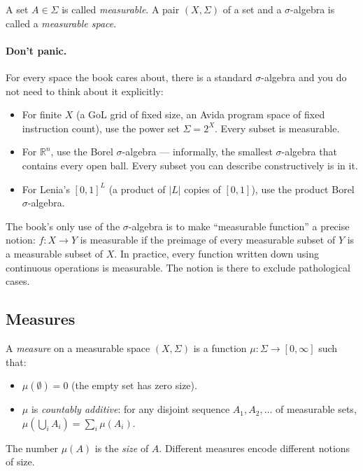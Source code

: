 A set $A \in \Sigma$ is called \emph{measurable}. A pair $(X,
\Sigma)$ of a set and a $\sigma$-algebra is called a \emph{measurable
space}.

\paragraph{Don't panic.} For every space the book cares about, there
is a standard $\sigma$-algebra and you do not need to think about it
explicitly:

\begin{itemize}[leftmargin=1.5em,itemsep=2pt]
  \item For finite $X$ (a GoL grid of fixed size, an Avida program
    space of fixed instruction count), use the power set $\Sigma =
    2^X$. Every subset is measurable.
  \item For $\mathbb{R}^n$, use the Borel $\sigma$-algebra ---
    informally, the smallest $\sigma$-algebra that contains every
    open ball. Every subset you can describe constructively is in
    it.
  \item For Lenia's $[0,1]^L$ (a product of $|L|$ copies of $[0,1]$),
    use the product Borel $\sigma$-algebra.
\end{itemize}

The book's only use of the $\sigma$-algebra is to make ``measurable
function'' a precise notion: $f : X \to Y$ is measurable if the
preimage of every measurable subset of $Y$ is a measurable subset of
$X$. In practice, every function written down using continuous
operations is measurable. The notion is there to exclude
pathological cases.

\subsection*{Measures}

A \emph{measure} on a measurable space $(X, \Sigma)$ is a function
$\mu : \Sigma \to [0, \infty]$ such that:

\begin{itemize}[leftmargin=1.5em,itemsep=2pt]
  \item $\mu(\emptyset) = 0$ (the empty set has zero size).
  \item $\mu$ is \emph{countably additive}: for any disjoint
    sequence $A_1, A_2, \ldots$ of measurable sets, $\mu(\bigcup_i
    A_i) = \sum_i \mu(A_i)$.
\end{itemize}

The number $\mu(A)$ is the \emph{size} of $A$. Different measures
encode different notions of size.

